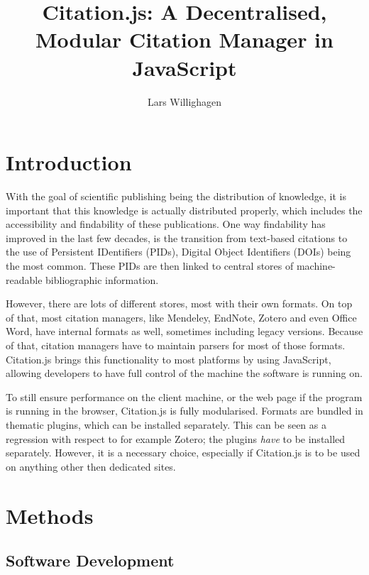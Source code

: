 \documentclass[fleqn,10pt,lineno]{wlpeerj} %
\title{Citation.js: A Decentralised, Modular Citation Manager in JavaScript}
\author[1]{Lars Willighagen}
\affil[1]{Eindhoven, The Netherlands}
\begin{document}
\flushbottom
\maketitle
\thispagestyle{empty}

\section*{Introduction}

With the goal of scientific publishing being the distribution of knowledge, it is important that this knowledge is actually distributed properly, which includes the accessibility and findability of these publications. One way findability has improved in the last few decades, is the transition from text-based citations to the use of Persistent IDentifiers (PIDs), Digital Object Identifiers (DOIs) being the most common. These PIDs are then linked to central stores of machine-readable bibliographic information.

However, there are lots of different stores, most with their own formats. On top of that, most citation managers, like Mendeley, EndNote, Zotero and even Office Word, have internal formats as well, sometimes including legacy versions. Because of that, citation managers have to maintain parsers for most of those formats. Citation.js brings this functionality to most platforms by using JavaScript, allowing developers to have full control of the machine the software is running on.

To still ensure performance on the client machine, or the web page if the program is running in the browser, Citation.js is fully modularised. Formats are bundled in thematic plugins, which can be installed separately. This can be seen as a regression with respect to for example Zotero; the plugins \textit{have} to be installed separately. However, it is a necessary choice, especially if Citation.js is to be used on anything other then dedicated sites.

\section*{Methods}

\subsection*{Software Development}
\end{document}
